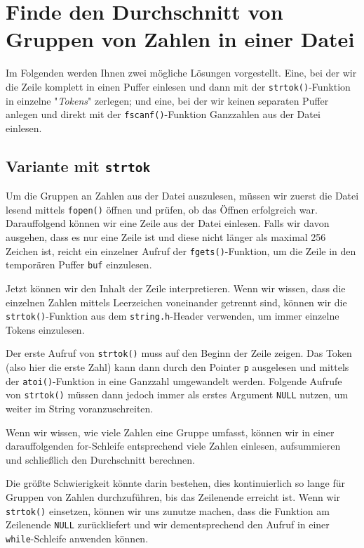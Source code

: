 \chapter{Finde den Durchschnitt von Gruppen von Zahlen in einer Datei}

Im Folgenden werden Ihnen zwei mögliche Lösungen vorgestellt. Eine, bei der wir
die Zeile komplett in einen Puffer einlesen und dann mit der
\texttt{strtok()}-Funktion in einzelne "\textit{Tokens}" zerlegen; und
eine, bei der wir keinen separaten Puffer anlegen und direkt mit der
\texttt{fscanf()}-Funktion Ganzzahlen aus der Datei einlesen.

\section*{Variante mit \texttt{strtok}}

Um die Gruppen an Zahlen aus der Datei auszulesen, müssen wir zuerst die Datei
lesend mittels \texttt{fopen()} öffnen und prüfen, ob das Öffnen
erfolgreich war. Darauffolgend können wir eine Zeile aus der Datei einlesen.
Falls wir davon ausgehen, dass es nur eine Zeile ist und diese nicht länger als
maximal 256 Zeichen ist, reicht ein einzelner Aufruf der
\texttt{fgets()}-Funktion, um die Zeile in den temporären Puffer
\texttt{buf} einzulesen.

Jetzt können wir den Inhalt der Zeile interpretieren. Wenn wir wissen, dass die
einzelnen Zahlen mittels Leerzeichen voneinander getrennt sind, können wir die
\texttt{strtok()}-Funktion aus dem \texttt{string.h}-Header
verwenden, um immer einzelne Tokens einzulesen.

Der erste Aufruf von \texttt{strtok()} muss auf den Beginn der Zeile
zeigen. Das Token (also hier die erste Zahl) kann dann durch den Pointer
\texttt{p} ausgelesen und mittels der \texttt{atoi()}-Funktion in
eine Ganzzahl umgewandelt werden. Folgende Aufrufe von \texttt{strtok()}
müssen dann jedoch immer als erstes Argument \texttt{NULL} nutzen, um
weiter im String voranzuschreiten.

Wenn wir wissen, wie viele Zahlen eine Gruppe umfasst, können wir in einer
darauffolgenden for-Schleife entsprechend viele Zahlen einlesen, aufsummieren
und schließlich den Durchschnitt berechnen.

Die größte Schwierigkeit könnte darin bestehen, dies kontinuierlich so lange für
Gruppen von Zahlen durchzuführen, bis das Zeilenende erreicht ist. Wenn wir
\texttt{strtok()} einsetzen, können wir uns zunutze machen, dass die
Funktion am Zeilenende \texttt{NULL} zurückliefert und wir
dementsprechend den Aufruf in einer \texttt{while}-Schleife anwenden
können.

